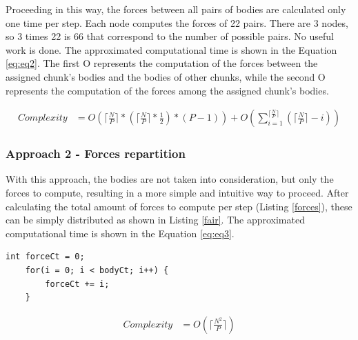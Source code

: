 \documentclass[a4paper]{article}
\begin{document}
Proceeding in this way, the forces between all pairs of bodies are calculated only one time per step. Each node computes the forces of 22 pairs. There are 3 nodes, so 3 times 22 is 66 that correspond to the number of possible pairs. No useful work is done. The approximated computational time is shown in the Equation \ref{eq:eq2}. The first O represents the computation of the forces between the assigned chunk's bodies and the bodies of other chunks, while the second O represents the computation of the forces among the assigned chunk's bodies.

\begin{equation} \label{eq:eq2}
\begin{split}
Complexity & = O(\lceil\frac{N}{P}\rceil * (\lceil\frac{N}{P}\rceil * \frac{1}{2}) * (P-1)) +  O(\sum_{i=1}^{\lceil\frac{N}{P}\rceil} {(\lceil\frac{N}{P}\rceil-i)})
\end{split}
\end{equation}

\subsubsection{Approach 2 - Forces repartition}
\label{sec:a2}
With this approach, the bodies are not taken into consideration, but only the forces to compute, resulting in a more simple and intuitive way to proceed. After calculating the total amount of forces to compute per step (Listing \ref{forces}), these can be simply distributed as shown in Listing \ref{fair}. The approximated computational time is shown in the Equation \ref{eq:eq3}.

\begin{lstlisting}[label=forces, caption=total amount of forces]
int forceCt = 0;
    for(i = 0; i < bodyCt; i++) {
        forceCt += i;
    }
\end{lstlisting}

\begin{equation} \label{eq:eq3}
\begin{split}
Complexity & = O(\lceil\frac{N^2}{P}\rceil)
\end{split}
\end{equation}
\end{document}
